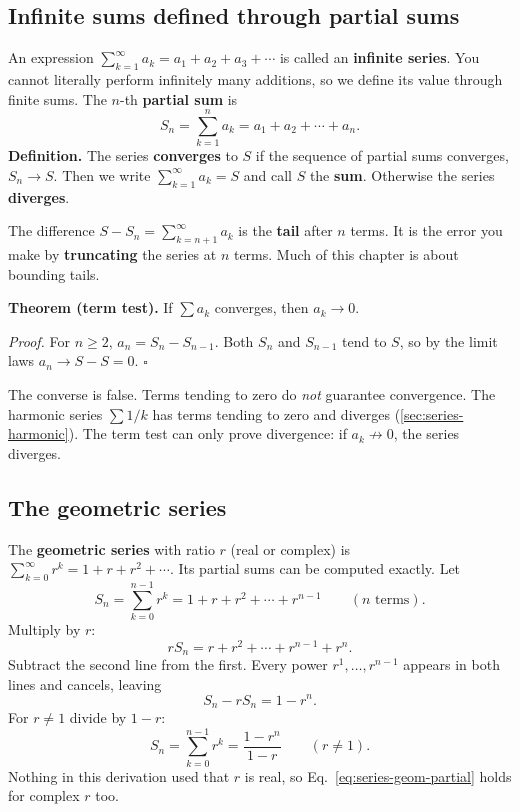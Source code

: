 \subsection{Infinite sums defined through partial sums}

An expression $\sum_{k=1}^{\infty}a_k=a_1+a_2+a_3+\cdots$ is called an \textbf{infinite series}. You cannot literally perform infinitely many additions, so we define its value through finite sums. The $n$-th \textbf{partial sum} is
\[
S_n=\sum_{k=1}^{n}a_k=a_1+a_2+\cdots+a_n .
\]
\textbf{Definition.} The series \textbf{converges} to $S$ if the sequence of partial sums converges, $S_n\to S$. Then we write $\sum_{k=1}^\infty a_k=S$ and call $S$ the \textbf{sum}. Otherwise the series \textbf{diverges}.

The difference $S-S_n=\sum_{k=n+1}^\infty a_k$ is the \textbf{tail} after $n$ terms. It is the error you make by \textbf{truncating} the series at $n$ terms. Much of this chapter is about bounding tails.

\textbf{Theorem (term test).} If $\sum a_k$ converges, then $a_k\to0$.

\emph{Proof.} For $n\ge2$, $a_n=S_n-S_{n-1}$. Both $S_n$ and $S_{n-1}$ tend to $S$, so by the limit laws $a_n\to S-S=0$. $\square$

\begin{pitfall}
The converse is false. Terms tending to zero do \emph{not} guarantee convergence. The harmonic series $\sum 1/k$ has terms tending to zero and diverges (\cref{sec:series-harmonic}). The term test can only prove divergence: if $a_k\not\to0$, the series diverges.
\end{pitfall}

\subsection{The geometric series}

The \textbf{geometric series} with ratio $r$ (real or complex) is $\sum_{k=0}^{\infty}r^k=1+r+r^2+\cdots$. Its partial sums can be computed exactly. Let
\[
S_n=\sum_{k=0}^{n-1}r^k=1+r+r^2+\cdots+r^{n-1}\qquad(n \text{ terms}).
\]
Multiply by $r$:
\[
rS_n=r+r^2+\cdots+r^{n-1}+r^{n}.
\]
Subtract the second line from the first. Every power $r^1,\dots,r^{n-1}$ appears in both lines and cancels, leaving
\[
S_n-rS_n=1-r^n .
\]
For $r\ne1$ divide by $1-r$:
\begin{equation}
S_n=\sum_{k=0}^{n-1}r^k=\frac{1-r^n}{1-r}\qquad(r\ne1).
\label{eq:series-geom-partial}
\end{equation}
Nothing in this derivation used that $r$ is real, so Eq.~\eqref{eq:series-geom-partial} holds for complex $r$ too.

